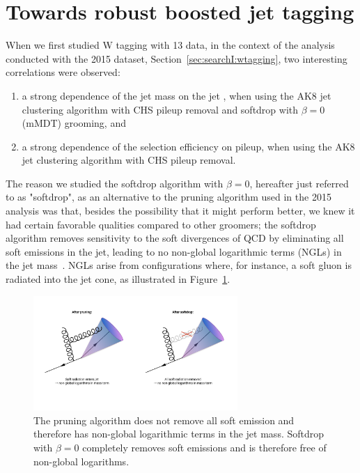 \section{Towards robust boosted jet tagging}
\label{sec:searchII:intro}
When we first studied W tagging with 13 \TeV data, in the context of the analysis conducted with the 2015 dataset, Section~\ref{sec:searchI:wtagging}, two interesting correlations were observed:
\bigskip
\begin{enumerate}[1)]
\item a strong dependence of the jet mass on the jet \PT, when using the AK8 jet clustering algorithm with CHS pileup removal and softdrop with $\beta = 0$ (mMDT) grooming, and
\item a strong dependence of the \nsubj selection efficiency on pileup, when using the AK8 jet clustering algorithm with CHS pileup removal.
\end{enumerate}
\bigskip
\noindent The reason we studied the softdrop algorithm with $\beta = 0$, hereafter just referred to as "softdrop", as an alternative to the pruning algorithm used in the 2015 analysis was that, besides the possibility that it might perform better, we knew it had certain favorable qualities compared to other groomers; the softdrop algorithm removes sensitivity to the soft divergences of QCD by eliminating all soft emissions in the jet, leading to no non-global logarithmic terms (NGLs) in the jet mass~\cite{Dasgupta:2013ihk}. NGLs arise from configurations where, for instance, a soft gluon is radiated into the jet cone, as illustrated in Figure~\ref{fig:searchII:ngls}. 
\begin{figure}[h!]
\centering
\includegraphics[width=0.69\textwidth]{figures/analysis/search2/misc/ngls.pdf}
\caption{The pruning algorithm does not remove all soft emission and therefore has non-global logarithmic terms in the jet mass. Softdrop with $\beta = 0$ completely removes soft emissions and is therefore free of non-global logarithms.}
\label{fig:searchII:ngls}
\end{figure}

